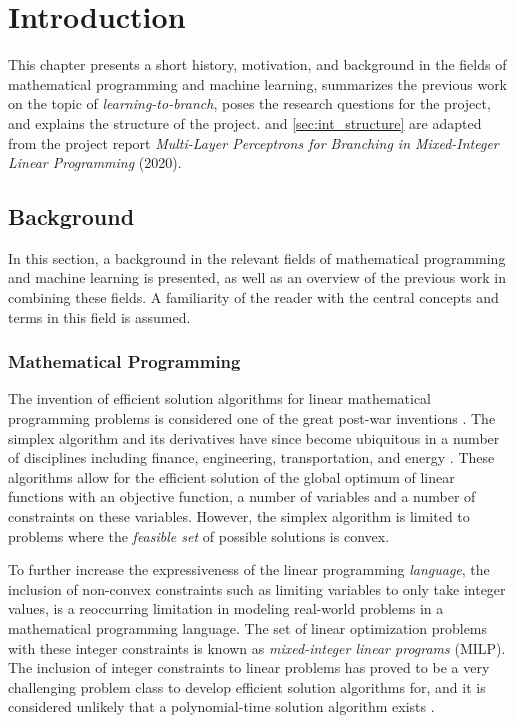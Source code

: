 \chapter{Introduction}\label{cha:introduction}
%
This chapter presents a short history, motivation, and background in the fields of mathematical programming and machine learning, summarizes the previous work on the topic of \textit{learning-to-branch}, poses the research questions for the project, and explains the structure of the project.  and \ref{sec:int_structure} are adapted from the project report \textit{Multi-Layer Perceptrons for Branching in Mixed-Integer Linear Programming} (2020). 


\section{Background}\label{sec:int_background}

In this section, a background in the relevant fields of mathematical programming and machine learning is presented, as well as an overview of the previous work in combining these fields. A familiarity of the reader with the central concepts and terms in this field is assumed.

\subsection{Mathematical Programming}

The invention of efficient solution algorithms for linear mathematical programming problems is considered one of the great post-war inventions \cite{dantzig1983reminiscences}. The simplex algorithm and its derivatives have since become ubiquitous in a number of disciplines including finance, engineering, transportation, and energy \cite{junger2010years}. These algorithms allow for the efficient solution of the global optimum of linear functions with an objective function, a number of variables and a number of constraints on these variables. However, the simplex algorithm is limited to problems where the \textit{feasible set} of possible solutions is convex.

To further increase the expressiveness of the linear programming \textit{language}, the inclusion of non-convex constraints such as limiting variables to only take integer values, is a reoccurring limitation in modeling real-world problems in a mathematical programming language. The set of linear optimization problems with these integer constraints is known as \textit{mixed-integer linear programs} (\gls{MILP}). The inclusion of integer constraints to linear problems has proved to be a very challenging problem class to develop efficient solution algorithms for, and it is considered unlikely that a polynomial-time solution algorithm exists \cite{bengio2020machine}.


